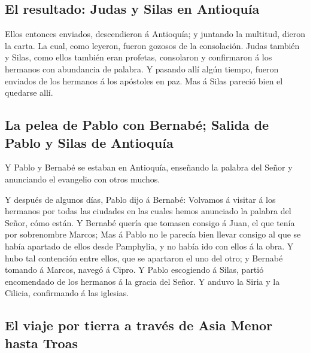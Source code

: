 \hypertarget{el-resultado-judas-y-silas-en-antioquuxeda}{%
\subsection{El resultado: Judas y Silas en
Antioquía}\label{el-resultado-judas-y-silas-en-antioquuxeda}}

 Ellos entonces enviados, descendieron á Antioquía; y
juntando la multitud, dieron la carta.  La cual, como
leyeron, fueron gozosos de la consolación.  Judas también
y Silas, como ellos también eran profetas, consolaron y confirmaron á
los hermanos con abundancia de palabra.  Y pasando allí
algún tiempo, fueron enviados de los hermanos á los apóstoles en paz.
 Mas á Silas pareció bien el quedarse allí.

\hypertarget{la-pelea-de-pablo-con-bernabuxe9-salida-de-pablo-y-silas-de-antioquuxeda}{%
\subsection{La pelea de Pablo con Bernabé; Salida de Pablo y Silas de
Antioquía}\label{la-pelea-de-pablo-con-bernabuxe9-salida-de-pablo-y-silas-de-antioquuxeda}}

 Y Pablo y Bernabé se estaban en Antioquía, enseñando la
palabra del Señor y anunciando el evangelio con otros muchos.

 Y después de algunos días, Pablo dijo á Bernabé:
Volvamos á visitar á los hermanos por todas las ciudades en las cuales
hemos anunciado la palabra del Señor, cómo están.  Y
Bernabé quería que tomasen consigo á Juan, el que tenía por sobrenombre
Marcos;  Mas á Pablo no le parecía bien llevar consigo al
que se había apartado de ellos desde Pamphylia, y no había ido con ellos
á la obra.  Y hubo tal contención entre ellos, que se
apartaron el uno del otro; y Bernabé tomando á Marcos, navegó á Cipro.
 Y Pablo escogiendo á Silas, partió encomendado de los
hermanos á la gracia del Señor.  Y anduvo la Siria y la
Cilicia, confirmando á las iglesias.

\hypertarget{el-viaje-por-tierra-a-travuxe9s-de-asia-menor-hasta-troas}{%
\subsection{El viaje por tierra a través de Asia Menor hasta
Troas}\label{el-viaje-por-tierra-a-travuxe9s-de-asia-menor-hasta-troas}}

